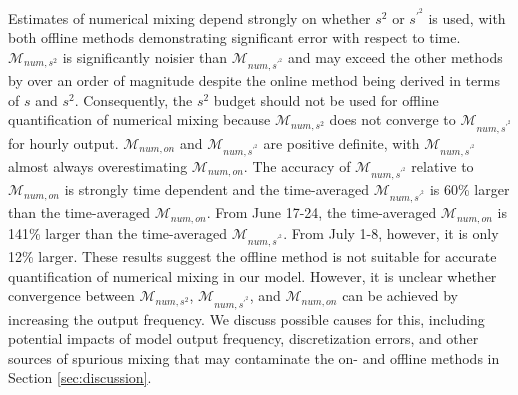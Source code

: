 Estimates of numerical mixing depend strongly on whether $s^2$ or $s^{\prime^2}$ is used, with both offline methods demonstrating significant error with respect to time. $\mathcal{M}_{num, s^2}$ is significantly noisier than $\mathcal{M}_{num, s^{\prime^2}}$ and may exceed the other methods by over an order of magnitude despite the online method being derived in terms of $s$ and $s^2$. Consequently, the $s^2$ budget should not be used for offline quantification of numerical mixing because $\mathcal{M}_{num, s^2}$ does not converge to $\mathcal{M}_{num, s^{\prime^2}}$ for hourly output. $\mathcal{M}_{num, on}$ and $\mathcal{M}_{num, s^{\prime^2}}$ are positive definite, with $\mathcal{M}_{num, s^{\prime^2}}$ almost always overestimating $\mathcal{M}_{num, on}$. The accuracy of $\mathcal{M}_{num, s^{\prime^2}}$ relative to $\mathcal{M}_{num, on}$ is strongly time dependent and the time-averaged $\mathcal{M}_{num, s^{\prime^2}}$ is 60\% larger than the time-averaged $\mathcal{M}_{num, on}$. From June 17-24, the time-averaged $\mathcal{M}_{num, on}$ is 141\% larger than the time-averaged $\mathcal{M}_{num, s^{\prime^2}}$. From July 1-8, however, it is only 12\% larger. These results suggest the offline method is not suitable for accurate quantification of numerical mixing in our model. However, it is unclear whether convergence between $\mathcal{M}_{num, s^2}$, $\mathcal{M}_{num, s^{\prime^2}}$, and $\mathcal{M}_{num,on}$ can be achieved by increasing the output frequency. We discuss possible causes for this, including potential impacts of model output frequency, discretization errors, and other sources of spurious mixing that may contaminate the on- and offline methods in Section \ref{sec:discussion}.  

